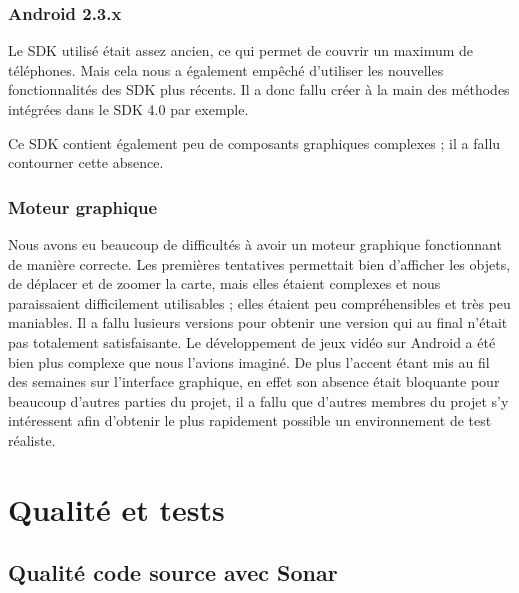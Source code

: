 \documentclass{report}
\begin{document}
\subsubsection{Android 2.3.x}

Le SDK utilisé était assez ancien, ce qui permet de couvrir un maximum
de téléphones. Mais cela nous a également empêché d’utiliser les
nouvelles  fonctionnalités des SDK plus récents. Il a donc fallu créer
à la main des méthodes intégrées dans le SDK 4.0 par exemple.

Ce SDK contient également peu de composants graphiques complexes ; il a
fallu contourner cette absence.

\subsubsection{Moteur graphique}

Nous avons eu beaucoup de difficultés à avoir un moteur graphique
fonctionnant de manière correcte. Les premières tentatives permettait
bien d’afficher les objets, de déplacer et de zoomer la carte, mais
elles étaient complexes et nous paraissaient difficilement utilisables ;
elles étaient peu compréhensibles et très peu maniables. Il a fallu
lusieurs versions pour obtenir une version qui au final n’était pas
totalement satisfaisante. Le développement de jeux vidéo sur Android a
été bien plus complexe que nous l’avions imaginé. De plus l’accent étant
mis au fil des semaines sur l’interface graphique, en effet son absence
était bloquante pour beaucoup d’autres parties du projet, il a fallu que
d’autres membres du projet s’y intéressent afin d’obtenir le plus
rapidement possible un environnement de test réaliste.
\newpage

\newpage

\section{Qualité et tests}
\bigskip


\subsection{Qualité code source avec Sonar}
\bigskip
\end{document}
